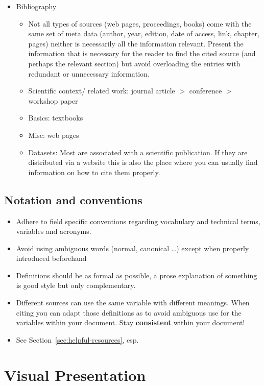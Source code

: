 \documentclass[twocolumn]{mlai-guide}
\begin{document}
\begin{itemize}
	\item Bibliography \label{general_bib}
	\begin{itemize}
		\item Not all types of sources (web pages, proceedings, books) come with the same set of meta data (author, year, edition, date of access, link, chapter, pages) neither is necessarily all the information relevant. Present the information that is necessary for the reader to find the cited source (and perhaps the relevant section) but avoid overloading the entries with redundant or unnecessary information.
		\item Scientific context/ related work: journal article $>$ conference $>$ workshop paper
		\item Basics: textbooks
		\item Misc: web pages
		\item Datasets: Most are associated with a scientific publication. If they are distributed via a website this is also the place where you can usually find information on how to cite them properly.
	\end{itemize}

\end{itemize}

\subsection{Notation and conventions}

\begin{itemize}
	\item Adhere to field specific conventions regarding vocabulary and technical terms, variables and acronyms.
	\item Avoid using ambiguous words (normal, canonical \dots) except when properly introduced beforehand
	\item Definitions should be as formal as possible, a prose explanation of something is good style but only complementary.
	\item Different sources can use the same variable with different meanings. When citing you can adapt those definitions as to avoid ambiguous use for the variables within your document. Stay \textbf{consistent} within your document!
	\item See Section~\ref{sec:helpful-resources}, esp. \cite[pp. 1-8]{knuth_mathematical_writing}
\end{itemize}

\section{Visual Presentation}
\end{document}
